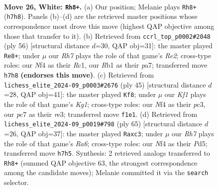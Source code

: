 \documentclass[11pt]{article}
\begin{document}
\clearpage

\begin{figure}[p]\centering
\begin{subfigure}{0.46\textwidth}\centering
\resizebox{\linewidth}{!}{%
\newchessgame
\chessboard[
  setfen={2k5/ppp4R/8/5p2/4pN2/8/PPrr1P1P/1R3K2 w - - 4 26},
  showmover=false,
  pgfstyle=straightmove, color=movearrow, markmove={h7-h8}
]}
\caption{}
\end{subfigure}\hfill
\begin{subfigure}{0.46\textwidth}\centering
\resizebox{\linewidth}{!}{%
\newchessgame
\chessboard[
  setfen={6k1/p1p3pp/2Pr1r2/8/8/5P2/PP2R1KP/2R5 w - - 2 29},
  showmover=false,
  pgfstyle=straightmove, color=movearrow, markmove={e2-e8}
]}
\caption{}
\end{subfigure}
\\[4pt]
\begin{subfigure}{0.46\textwidth}\centering
\resizebox{\linewidth}{!}{%
\newchessgame
\chessboard[
  setfen={2r3k1/ppp1Rp2/6p1/8/6P1/2P1R3/P1Pr1PP1/5K2 b - - 6 23},
  showmover=false,
  pgfstyle=straightmove, color=movearrow, markmove={g8-f8}
]}
\caption{}
\end{subfigure}\hfill
\begin{subfigure}{0.46\textwidth}\centering
\resizebox{\linewidth}{!}{%
\newchessgame
\chessboard[
  setfen={8/2r3kp/pR2Rp2/3p4/3P4/r1P3P1/5PK1/8 b - - 1 33},
  showmover=false,
  pgfstyle=straightmove, color=movearrow, markmove={a3-c3}
]}
\caption{}
\end{subfigure}
\caption{\textbf{Move 26, White: \texttt{Rh8+}.} (a) Our position; Melanie plays \texttt{Rh8+} (\texttt{h7h8}). Panels (b)--(d) are the retrieved master positions whose correspondence most drove this move (highest QAP objective among those that transfer to it). (b) Retrieved from \texttt{ccrl\_top\_p0002\#2048} (ply 56) [structural distance $d$=30, QAP obj=31]: the master played \texttt{Re8+}; under $\mu$ our \emph{Rh7} plays the role of that game's \emph{Re2}; cross-type roles: our \emph{N}f4 as their \emph{R}c1, our \emph{R}b1 as their \emph{p}a7; transferred move \texttt{h7h8} \textbf{(endorses this move)}. (c) Retrieved from \texttt{lichess\_elite\_2024-09\_p0003\#2676} (ply 45) [structural distance $d$=28, QAP obj=41]: the master played \texttt{Kf8}; under $\mu$ our \emph{Kf1} plays the role of that game's \emph{Kg1}; cross-type roles: our \emph{N}f4 as their \emph{p}c3, our \emph{p}c7 as their \emph{r}e3; transferred move \texttt{f1e1}. (d) Retrieved from \texttt{lichess\_elite\_2024-09\_p0019\#798} (ply 65) [structural distance $d$=26, QAP obj=37]: the master played \texttt{Raxc3}; under $\mu$ our \emph{Rh7} plays the role of that game's \emph{Ra6}; cross-type roles: our \emph{N}f4 as their \emph{P}d5; transferred move \texttt{h7h5}. Synthesis: 2 retrieved analogs transferred to \texttt{Rh8+} (summed QAP objective 63, the strongest correspondence among the candidate moves); Melanie committed it via the \texttt{search} selector.}
\label{fig:thought-m50}
\end{figure}
\end{document}
